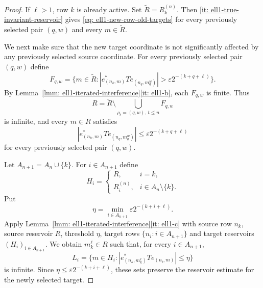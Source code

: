 \documentclass[11pt]{amsart}
\theoremstyle{plain}
\theoremstyle{definition}
\numberwithin{equation}{section}
\renewcommand{\le}{\leqslant}
\renewcommand{\leq}{\leqslant}
\begin{document}
\begin{proof}
    If $\ell>1$, row $k$ is already active. Set $\widetilde R=R_k^{(n)}$. Then \ref{it: ell1-true-invariant-reservoir} gives \eqref{eq: ell1-new-row-old-targets} for every previously selected pair $(q,w)$ and every $m\in\widetilde R$.

    We next make sure that the new target coordinate is not significantly affected by any previously selected source coordinate. For every previously selected pair $(q,w)$ define
    \begin{equation*}
        F_{q,w}=\{m\in\widetilde R: |e^*_{(n_k,m)}T e_{(n_q,m_q^w)}|>\varepsilon2^{-(k+q+\ell)}\}.
    \end{equation*}
    By Lemma~\ref{lmm: ell1-iterated-interference}\ref{it: ell1-b}, each $F_{q,w}$ is finite. Thus
    \begin{equation*}
        R=\widetilde R\setminus\bigcup_{\rho_t=(q,w),\,t\le n}F_{q,w}
    \end{equation*}
    is infinite, and every $m\in R$ satisfies
    \begin{equation}\label{eq: ell1-new-target-old-sources}
        |e^*_{(n_k,m)}T e_{(n_q,m_q^w)}|
        \leq \varepsilon2^{-(k+q+\ell)}
    \end{equation}
    for every previously selected pair $(q,w)$.

    Let $A_{n+1}=A_n\cup\{k\}$. For $i\in A_{n+1}$ define
    \begin{equation*}
        H_i=
        \begin{cases}
            R, & i=k,\\
            R_i^{(n)}, & i\in A_n\setminus\{k\}.
        \end{cases}
    \end{equation*}
    Put
    \begin{equation*}
        \eta=\min_{i\in A_{n+1}} \varepsilon2^{-(k+i+\ell)}.
    \end{equation*}
    Apply Lemma~\ref{lmm: ell1-iterated-interference}\ref{it: ell1-c} with source row $n_k$, source reservoir $R$, threshold $\eta$, target rows $\{n_i:i\in A_{n+1}\}$ and target reservoirs $(H_i)_{i\in A_{n+1}}$. We obtain $m_k^\ell\in R$ such that, for every $i\in A_{n+1}$,
    \begin{equation*}
        L_i=\{m\in H_i: |e^*_{(n_k,m_k^\ell)}T e_{(n_i,m)}|\leq\eta\}
    \end{equation*}
    is infinite. Since $\eta\leq \varepsilon2^{-(k+i+\ell)}$, these sets preserve the reservoir estimate for the newly selected target.


\end{proof}
\end{document}
